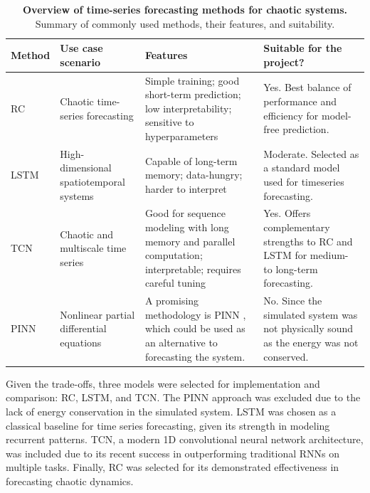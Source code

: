 \documentclass[%
 reprint,
 amsmath,amssymb,
 aps,
]{revtex4-2}
\begin{document}
\begin{table}
    \caption{\textbf{Overview of time-series forecasting methods for chaotic systems.} Summary of commonly used methods, their features, and suitability.}
    \label{tab:methodsoverview}
    \begin{tabular}{|p{2cm}|p{3cm}|p{6cm}|p{6cm}|}
    \hline
       \textbf{Method}  &  \textbf{Use case scenario}   &  \textbf{Features}  &  \textbf{Suitable for the project?}   \\
    \hline
        RC  & Chaotic time-series forecasting & Simple training; good short-term prediction; low interpretability; sensitive to hyperparameters \cite{pathak2018model, Chattopadhyay2019} & Yes. Best balance of performance and efficiency for model-free prediction.  \\
    \hline
        LSTM & High-dimensional spatiotemporal systems & Capable of long-term memory; data-hungry; harder to interpret \cite{vlachas2018data} & Moderate. Selected as a standard model used for timeseries forecasting.  \\
    \hline
        TCN & Chaotic and multiscale time series & Good for sequence modeling with long memory and parallel computation; interpretable; requires careful tuning \cite{bai2018empiricalevaluationgenericconvolutional} & Yes. Offers complementary strengths to RC and LSTM for medium- to long-term forecasting. \\
    \hline
        PINN & Nonlinear partial differential equations & A promising methodology is PINN \cite{RAISSI2019686}, which could be used as an alternative to forecasting the system. & No. Since the simulated system was not physically sound as the energy was not conserved. \\
    \hline
    \end{tabular}
\end{table}

Given the trade-offs, three models were selected for implementation and comparison: RC, LSTM, and TCN. The PINN approach was excluded due to the lack of energy conservation in the simulated system. LSTM was chosen as a classical baseline for time series forecasting, given its strength in modeling recurrent patterns. TCN, a modern 1D convolutional neural network architecture, was included due to its recent success in outperforming traditional RNNs on multiple tasks. Finally, RC was selected for its demonstrated effectiveness in forecasting chaotic dynamics.

\end{document}
